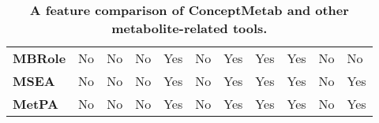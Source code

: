 \begin{sidewaystable}[!ht]
\begin{tabular}{l|p{1.5cm}p{1.5cm}|p{1cm}p{1cm}p{1cm}p{1cm}|p{2cm}p{2cm}p{2cm}|p{2cm}}
\textbf{MBRole}       & No                                   & No                         & No            & Yes                         & No          & Yes              & Yes                                                 & Yes                                                & No                                               & No                      \\
\textbf{MSEA}         & No                                   & No                         & No            & Yes                         & No          & Yes              & Yes                                                 & Yes                                                & No                                               & Yes                     \\
\textbf{MetPA}        & No                                   & No                         & No            & Yes                         & No          & Yes              & Yes                                                 & Yes                                                & No                                               & Yes
\end{tabular}
\normalsize
\caption[A feature comparison of ConceptMetab and other metabolite-related tools.]
{
\textbf{A feature comparison of ConceptMetab and other metabolite-related tools.}
}
\label{chap3:table:2}

\end{sidewaystable}
